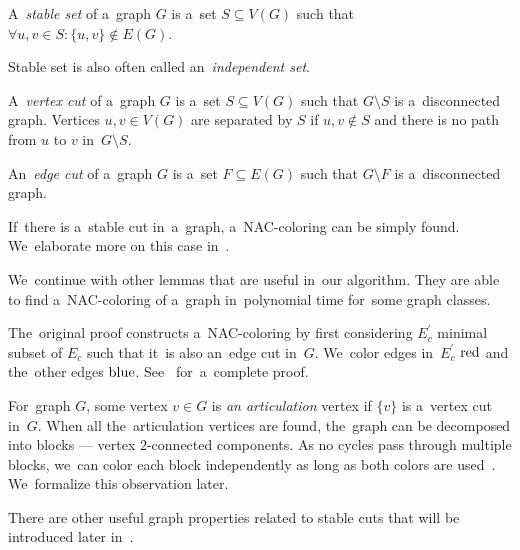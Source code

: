 %
\begin{definition}
	A~\emph{stable set} of a~graph \( G \) is a~set \( S \subseteq V(G) \) such that
	\( \forall u, v \in S : \{u, v\} \not\in E(G) \).
\end{definition}
%
Stable set is also often called an~\emph{independent set}.
%
\begin{definition}
	A~\emph{vertex cut} of a~graph \( G \) is a~set \( S \subseteq V(G) \) such that
	\( G \setminus S \) is a~disconnected graph.
	Vertices \( u, v \in V(G) \) are separated by \( S \)
	if \( u, v \not\in S \)
	and there is no path from \( u \) to \( v \) in~\( G \setminus S \).
\end{definition}
%
\begin{definition}
	An~\emph{edge cut} of a~graph \( G \) is a~set \( F \subseteq E(G) \) such that
	\( G \setminus F \) is a~disconnected graph.
\end{definition}
%
%
If~there is a~stable cut in~a~graph, a~NAC-coloring can be simply found.
We~elaborate more on this case in~.

We~continue with other lemmas that are useful in~our algorithm.
They are able to find a~NAC-coloring of a~graph in~polynomial time for~some graph classes.
%
%
The~original proof constructs a~NAC-coloring by first considering
\( E_c^\prime \) minimal subset of \( E_c \)
such that it~is also an~edge cut in~\( G \).
We~color edges in~\( E_c^\prime \) \( \text{red} \) and the~other edges \( \text{blue} \).
See~\cite{legersky_original} for~a~complete proof.

For~graph \( G \), some vertex \( v \in G \) is \emph{an articulation} vertex if
\( \{v\} \) is a~vertex cut in~\( G \).
When all the~articulation vertices are found,
the~graph can be decomposed into blocks
--- vertex \( 2 \)-connected components.
As no cycles pass through multiple blocks, we~can color each block
independently as long as both colors are used~\cite{my_paper}.
We~formalize this observation later.

There are other useful graph properties related to stable cuts
that will be introduced later in~.

